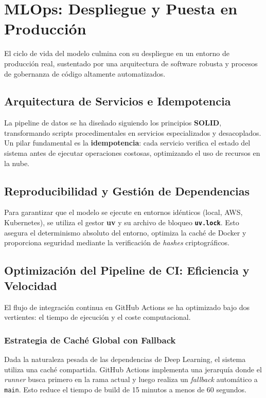 \section{MLOps: Despliegue y Puesta en Producción}
\label{sec:mlops}

El ciclo de vida del modelo culmina con su despliegue en un entorno de producción real, sustentado por una arquitectura de software robusta y procesos de gobernanza de código altamente automatizados.

\subsection{Arquitectura de Servicios e Idempotencia}
La pipeline de datos se ha diseñado siguiendo los principios \textbf{SOLID}, transformando scripts procedimentales en servicios especializados y desacoplados.
Un pilar fundamental es la \textbf{idempotencia}: cada servicio verifica el estado del sistema antes de ejecutar operaciones costosas, optimizando el uso de recursos en la nube.

\subsection{Reproducibilidad y Gestión de Dependencias}
Para garantizar que el modelo se ejecute en entornos idénticos (local, AWS, Kubernetes), se utiliza el gestor \textbf{uv} y su archivo de bloqueo \textbf{\texttt{uv.lock}}. Esto asegura el determinismo absoluto del entorno, optimiza la caché de Docker y proporciona seguridad mediante la verificación de \textit{hashes} criptográficos.

\subsection{Optimización del Pipeline de CI: Eficiencia y Velocidad}
El flujo de integración continua en GitHub Actions se ha optimizado bajo dos vertientes: el tiempo de ejecución y el coste computacional.

\subsubsection{Estrategia de Caché Global con Fallback}
Dada la naturaleza pesada de las dependencias de Deep Learning, el sistema utiliza una caché compartida. GitHub Actions implementa una jerarquía donde el \textit{runner} busca primero en la rama actual y luego realiza un \textit{fallback} automático a \texttt{main}. Esto reduce el tiempo de build de 15 minutos a menos de 60 segundos.


